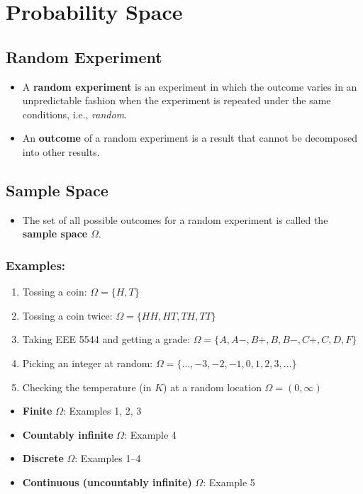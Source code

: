 \section{Probability Space}

\subsection{Random Experiment}
\begin{itemize}
\item A \textbf{random experiment} is an experiment in which the
outcome varies in an unpredictable fashion when the experiment is
repeated under the same conditions, i.e., \emph{random}.
\item An \textbf{outcome} of a random experiment is a result that
cannot be decomposed into other results.
\end{itemize}

\subsection{Sample Space}
\begin{itemize}
\item The set of all possible outcomes for a random experiment is
called the \textbf{sample space} \(\Omega\).
\end{itemize}

\subsubsection{Examples:}
\begin{enumerate}
\item Tossing a coin: \(\Omega=\{H, T\}\)
\item Tossing a coin twice: \(\Omega=\{H H, H T, T H, T T\}\)
\item Taking EEE 5544 and getting a grade:
\(
\Omega=\{A, A-, B+, B, B-, C+, C, D, F\}
\)
\item Picking an integer at random:
\(\Omega=\{\ldots,-3,-2,-1,0,1,2,3, \ldots \}\)
\item Checking the temperature (in $K$) at a random location
\(
\Omega=(0, \infty)
\)
\end{enumerate}

\begin{itemize}
\item \textbf{Finite} \(\Omega\): Examples 1, 2, 3
\item \textbf{Countably infinite} \(\Omega\): Example 4
\item \textbf{Discrete} \(\Omega\):  Examples 1--4
\item \textbf{Continuous (uncountably infinite)} \(\Omega\):  Example
5
\end{itemize}

